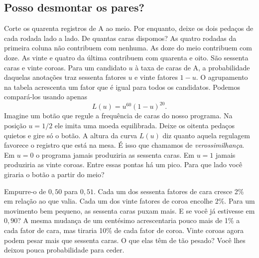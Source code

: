 \documentclass[12pt,oneside]{article}
\newcommand{\secao}[1]{\Needspace{5.2\baselineskip}\subsection*{#1}}
\newcommand{\bookanchor}[1]{\phantomsection\label{#1}}
\begin{document}
\secao{Posso desmontar os pares?}
Corte os quarenta registros de A ao meio. Por enquanto, deixe os dois pedaços de cada rodada lado a lado. De quantas caras dispomos? As quatro rodadas da primeira coluna não contribuem com nenhuma. As doze do meio contribuem com doze. As vinte e quatro da última contribuem com quarenta e oito. São sessenta caras e vinte coroas. Para um candidato $u$ à taxa de caras de A, a probabilidade daquelas anotações traz sessenta fatores $u$ e vinte fatores $1-u$. O agrupamento na tabela acrescenta um fator que é igual para todos os candidatos. Podemos compará-los usando apenas
\[
                         L(u)=u^{60}(1-u)^{20}.
\]
Imagine\bookanchor{topic-03-3} um botão que regule a frequência de caras do nosso programa. Na posição $u=1/2$ ele imita uma moeda equilibrada. Deixe os oitenta pedaços quietos e gire só o botão. A altura da curva $L(u)$ diz quanto aquela regulagem favorece o registro que está na mesa. É isso que chamamos de \emph{verossimilhança}. Em $u=0$ o programa jamais produziria as sessenta caras. Em $u=1$ jamais produziria as vinte coroas. Entre essas pontas há um pico. Para que lado você giraria o botão a partir do meio?

Empurre-o de $0{,}50$ para $0{,}51$. Cada um dos sessenta fatores de cara cresce 2\% em relação ao que valia. Cada um dos vinte fatores de coroa encolhe 2\%. Para um movimento bem pequeno, as sessenta caras puxam mais. E se você já estivesse em $0{,}90$? A mesma mudança de um centésimo acrescentaria pouco mais de 1\% a cada fator de cara, mas tiraria 10\% de cada fator de coroa. Vinte coroas agora podem pesar mais que sessenta caras. O que elas têm de tão pesado? Você lhes deixou pouca probabilidade para ceder.
\end{document}
